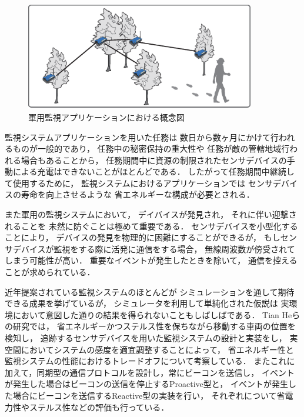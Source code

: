 \begin{figure}[htbp]
 \begin{center}
  \includegraphics[width=100mm]{./images/surveillance_system.eps}
 \end{center}
 \caption{軍用監視アプリケーションにおける概念図}
 \label{fig:surveillance_system}
\end{figure}


監視システムアプリケーションを用いた任務は
数日から数ヶ月にかけて行われるものが一般的であり，
任務中の秘密保持の重大性や
任務が敵の管轄地域行われる場合もあることから，
任務期間中に資源の制限されたセンサデバイスの手動による充電はできないことがほとんどである．
したがって任務期間中継続して使用するために，
監視システムにおけるアプリケーションでは
センサデバイスの寿命を向上させるような
省エネルギーな構成が必要とされる．

また軍用の監視システムにおいて，
デイバイスが発見され，
それに伴い迎撃されることを
未然に防ぐことは極めて重要である．
センサデバイスを小型化することにより，
デバイスの発見を物理的に困難にすることができるが，
もしセンサデバイスが監視をする際に活発に通信をする場合，
無線周波数が傍受されてしまう可能性が高い．
重要なイベントが発生したときを除いて，
通信を控えることが求められている．

近年提案されている監視システムのほとんどが
シミュレーションを通して期待できる成果を挙げているが，
シミュレータを利用して単純化された仮説は
実環境において意図した通りの結果を得られないこともしばしばである．
Tian Heらの研究\cite{He04energy-efficientsurveillance}では，
省エネルギーかつステルス性を保ちながら移動する車両の位置を検知し，
追跡するセンサデバイスを用いた監視システムの設計と実装をし，
実空間においてシステムの感度を適宜調整することによって，
省エネルギー性と監視システムの性能におけるトレードオフについて考察している．
またこれに加えて，同期型の通信プロトコルを設計し，常にビーコンを送信し，
イベントが発生した場合はビーコンの送信を停止するProactive型と，
イベントが発生した場合にビーコンを送信するReactive型の実装を行い，
それぞれについて省電力性やステルス性などの評価も行っている．


